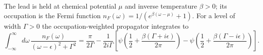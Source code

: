 \documentclass{article}
\begin{document}
The lead is held at chemical potential $\mu$ and inverse temperature $\beta>0$; its occupation is
the Fermi function $n_F(\omega) = 1/(e^{\beta(\omega-\mu)}+1)$. For a level of width $\Gamma>0$ the
occupation-weighted propagator integrates to
\begin{equation}
\int_{-\infty}^{\infty} d\omega\, \frac{n_F(\omega)}{(\omega-\epsilon)^2+\Gamma^2} = \frac{\pi}{2\Gamma} - \frac{1}{2i\Gamma}\left[\psi\left(\frac{1}{2}+\frac{\beta(\Gamma+i\epsilon)}{2\pi}\right)-\psi\left(\frac{1}{2}+\frac{\beta(\Gamma-i\epsilon)}{2\pi}\right)\right] .
\label{eq:occ}
\end{equation}
\end{document}
